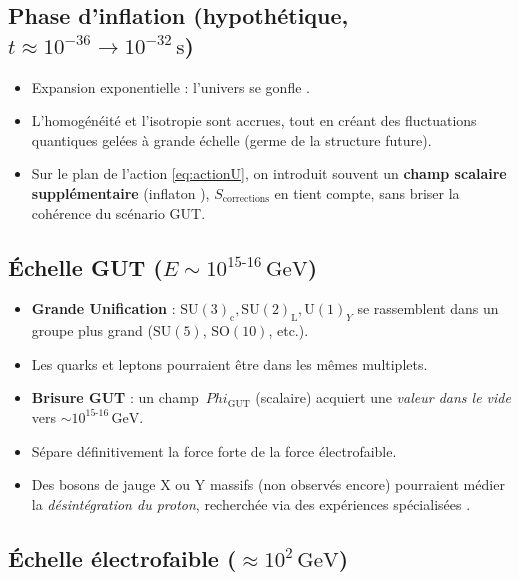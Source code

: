\documentclass[12pt]{article}
\def\Phi{Phi}%
\begin{document}
\subsection{Phase d'inflation (hypoth\'etique, \(t \approx 10^{-36} \to 10^{-32}\,\mathrm{s}\))}

\begin{itemize}
    \item Expansion exponentielle : l'univers se \og gonfle \fg{}.  
    \item L'homog\'en\'eit\'e et l'isotropie sont accrues, tout en cr\'eant des fluctuations quantiques 
          \og gel\'ees \fg{} \`a grande \'echelle (germe de la structure future).  
    \item Sur le plan de l'action \eqref{eq:actionU}, on introduit souvent un \textbf{champ scalaire suppl\'ementaire} 
          (\og inflaton \fg), $S_{\text{corrections}}$ en tient compte, sans briser la cohérence du sc\'enario GUT.
\end{itemize}

\subsection{\'Echelle GUT (\(E \sim 10^{15\text{-}16}\,\mathrm{GeV}\))}

\begin{itemize}
    \item \textbf{Grande Unification} : 
    \(\mathrm{SU}(3)_\mathrm{c}, \mathrm{SU}(2)_\mathrm{L}, \mathrm{U}(1)_Y\) 
    se rassemblent dans un groupe plus grand (\(\mathrm{SU}(5)\), \(\mathrm{SO}(10)\), etc.).  
    \item Les quarks et leptons pourraient \^etre dans les m\^emes multiplets.  
    \item \textbf{Brisure GUT} : 
    un champ \(\,\Phi_{\mathrm{GUT}}\) (scalaire) acquiert une \emph{valeur dans le vide} 
    vers \(\sim 10^{15\text{-}16}\,\mathrm{GeV}\).  
    \item S\'epare d\'efinitivement la force forte de la force \'electrofaible.  
    \item Des bosons de jauge \og X \fg{} ou \og Y \fg{} massifs (non observ\'es encore) 
          pourraient m\'edier la \emph{d\'esint\'egration du proton}, 
          recherch\'ee via des exp\'eriences sp\'ecialis\'ees \cite{superk, kamland}.
\end{itemize}

\subsection{\'Echelle \'electrofaible (\(\approx 10^2\,\mathrm{GeV}\))}
\end{document}
